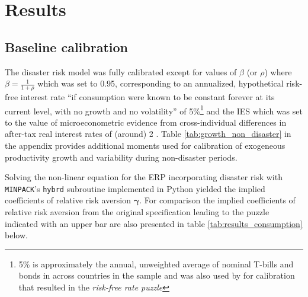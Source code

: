 \section{Results} \label{Results}

\subsection{Baseline calibration} \label{Baseline calibration}

The disaster risk model was fully calibrated except for values of $\beta$ (or $\rho$) where $\beta = \frac{1}{1+\rho}$ which was set to 0.95, corresponding to an annualized, hypothetical risk-free interest rate ``if consumption were known to be constant forever at its current level, with no growth and no volatility'' \cite{Constantinides2003} of 5\%\footnote{5\% is approximately the annual, unweighted average of nominal T-bills and bonds in \citet{Jorda2017} across countries in the sample and was also used by \citet{Weil1989} for calibration that resulted in the \textit{risk-free rate puzzle}} and the IES which was set to the value of microeconometric evidence from cross-individual differences in after-tax real interest rates of (around) 2 \cite{Gruber2013}. Table \ref{tab:growth_non_disaster} in the appendix provides additional moments used for calibration of exogeneous productivity growth and variability during non-disaster periods.

Solving the non-linear equation for the ERP incorporating disaster risk with \texttt{MINPACK}'s \texttt{hybrd} subroutine implemented in Python yielded the implied coefficients of relative risk aversion $\boldsymbol{\gamma}$. For comparison the implied coefficients of relative risk aversion from the original specification leading to the puzzle indicated with an upper bar are also presented in table \ref{tab:results_consumption} below.\\


